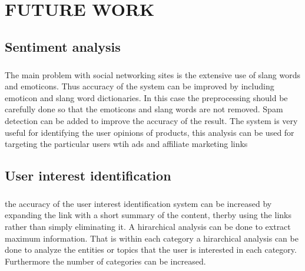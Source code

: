 \chapter{FUTURE WORK}
\section{Sentiment analysis}
	\paragraph{} The main problem with social networking sites is the extensive use of slang words and emoticons. Thus accuracy of the system can be improved by including emoticon and slang word dictionaries. In this case the preprocessing should be carefully done so that the emoticons and slang words are not removed. Spam detection can be added to improve the accuracy of the result. The system is very useful for identifying the user opinions of products, this analysis can be used for targeting the particular users wtih ads and affiliate marketing links
	
\section{User interest identification}
	\paragraph{} the accuracy of the user interest identification system can be increased by expanding the link with a short summary of the content, therby using the links rather than simply eliminating it. A hirarchical analysis can be done to extract maximum information. That is within each category a hirarchical analysis can be done to analyze the entities or topics that the user is interested in each category. Furthermore the number of categories can be increased.
	
